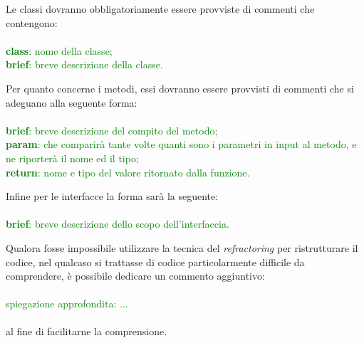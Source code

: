 Le classi dovranno obbligatoriamente essere provviste di commenti che contengono:
\\
\\
\textcolor{green}{
\textbf{class}: nome della classe;\\
\textbf{brief}: breve descrizione della classe.\\
}


Per quanto concerne i metodi, essi dovranno essere provvisti di commenti che si adeguano alla seguente forma:
\\
\\
\textcolor{green}{
\textbf{brief}: breve descrizione del compito del metodo;\\
\textbf{param}: che comparirà tante volte quanti sono i parametri in input al metodo, e ne riporterà il nome ed il tipo;\\
\textbf{return}: nome e tipo del valore ritornato dalla funzione.\\}

Infine per le interfacce la forma sarà la seguente:
\\
\\
\textcolor{green}{
\textbf{brief}: breve descrizione dello scopo dell'interfaccia.\\}

Qualora fosse impossibile utilizzare la tecnica del \textit{refractoring} per ristrutturare il codice, nel qualcaso si trattasse di codice particolarmente difficile da comprendere, è possibile dedicare un commento aggiuntivo:
\\
\\
\textcolor{green}{spiegazione approfondita: ...\\}\\
al fine di facilitarne la comprensione.
